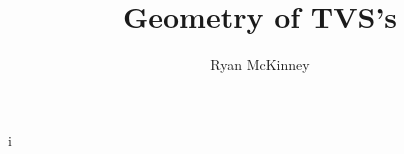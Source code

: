 \documentclass[12pt,oneside,letterpaper]{book}
\title{Geometry of TVS's}
\author{Ryan McKinney}
\begin{document}
	\newtheorem{thm}{Theorem}[section]
	\newtheorem{cor}[thm]{Corollary}i
	\newtheorem{lem}[thm]{Lemma}
	\newtheorem{prop}[thm]{Proposition}
	\newtheorem{example}[thm]{Example}
	\newtheorem{rmk}[thm]{Remark}
	\newtheorem{df}[thm]{Definition}


\frontmatter
\maketitle

\tableofcontents
\listoffigures
\listoftables


\mainmatter






\backmatter

\end{document}
